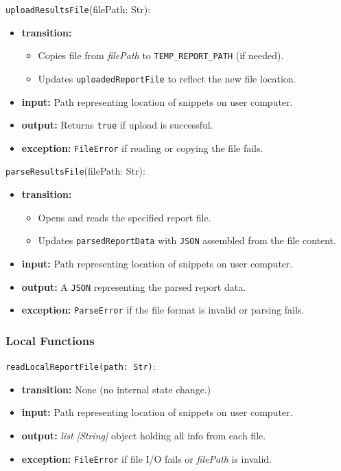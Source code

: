 \documentclass[12pt, titlepage]{article}
\begin{document}
\noindent \texttt{uploadResultsFile}(filePath: Str):
\begin{itemize}
    \item \textbf{transition:}
    \begin{itemize}
        \item Copies file from \textit{filePath} to \texttt{TEMP\_REPORT\_PATH} (if needed).
        \item Updates \texttt{uploadedReportFile} to reflect the new file location.
    \end{itemize}
    \item \textbf{input:} Path representing location of snippets on user computer.
    \item \textbf{output:} Returns \texttt{true} if upload is successful.
    \item \textbf{exception:} \texttt{FileError} if reading or copying the file fails.
\end{itemize}

\noindent \texttt{parseResultsFile}(filePath: Str):
\begin{itemize}
    \item \textbf{transition:}
    \begin{itemize}
        \item Opens and reads the specified report file.
        \item Updates \texttt{parsedReportData} with \texttt{JSON} assembled from the file content.
    \end{itemize}
    \item \textbf{input:} Path representing location of snippets on user computer.
    \item \textbf{output:} A \texttt{JSON} representing the parsed report data.
    \item \textbf{exception:} \texttt{ParseError} if the file format is invalid or parsing fails.
\end{itemize}

\subsubsection{Local Functions}

\noindent \texttt{readLocalReportFile(path: Str)}: 
\begin{itemize}
        \item \textbf{transition:} None (no internal state change.)
        \item \textbf{input:} Path representing location of snippets on user computer.
        \item \textbf{output:} \textit{list [String]} object holding all info from each file.
        \item \textbf{exception:} \texttt{FileError} if file I/O fails or \textit{filePath} is invalid.
\end{itemize}
\end{document}
